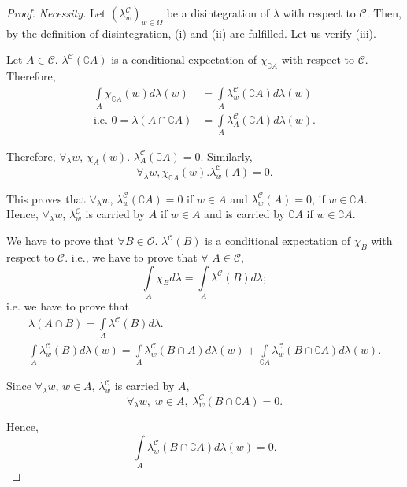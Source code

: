 \begin{proof}{\em Necessity.}
Let $(\lambda^\mathscr{C}_w)_{w \in\Omega}$ be a disintegration of
$\lambda$ with respect to $\mathscr{C}$. Then, by the definition of
disintegration, (i) and (ii) are fulfilled. Let us verify (iii). 

Let $A \in\mathscr{C}$. $\lambda^\mathscr{C} (\complement A)$ is a
conditional expectation of $\chi_{\complement A}$ with respect to
$\mathscr{C}$. Therefore,
\begin{align*}
\int\limits_A \chi_{\complement A}(w) d\lambda(w) & = \int\limits_A
\lambda^\mathscr{C}_w (\complement A) d\lambda(w)\\
\text{i.e. }  0 = \lambda (A \cap \complement A) & =
\int\limits_A \lambda^\mathscr{C}_A (\complement A)
d\lambda(w). 
\end{align*}\pageoriginale

Therefore, $\forall_\lambda w$, $\chi_A(w)$. $\lambda^\mathscr{C}_A
(\complement A) = 0$. Similarly, 
$$
\forall_\lambda w, \chi_{\complement A} (w). \lambda^\mathscr{C}_w (A)
=0. 
$$

This proves that $\forall_\lambda w$, $\lambda^\mathscr{C}_w
(\complement A) = 0$ if $w \in A$ and  $\lambda^\mathscr{C}_w(A) =0$,
if $w \in\complement A$. Hence, $\forall_\lambda w$,
$\lambda^\mathscr{C}_w$ is carried by $A$ if $w \in A$ and is carried
by $\complement A$ if $w \in\complement A$. 


\medskip
{} We have to prove that $\forall B \in
\mathscr{O}$. $\lambda^\mathscr{C}(B)$ is a conditional expectation of
$\chi_B$ with respect to $\mathscr{C}$. i.e., we have to prove that
$\forall$ $A \in \mathscr{C}$,
$$
\int\limits_A \chi_B d \lambda = \int\limits_A \lambda^\mathscr{C} (B)
d\lambda; 
$$ 
i.e. we have to prove that 
\begin{align*}
\lambda(A \cap B) = \int\limits_A \lambda^\mathscr{C} (B) d\lambda.\\
\int\limits_A \lambda^\mathscr{C}_w (B) d \lambda(w) = \int\limits_A
\lambda^\mathscr{C}_w (B \cap A)  d \lambda (w) +
\int\limits_{\complement A} \lambda^\mathscr{C}_w (B \cap \complement
A) d \lambda (w). 
\end{align*}

Since $\forall_\lambda w$, $w \in A$, $\lambda^\mathscr{C}_w$ is
carried by $A$,
$$
\forall_\lambda w, \; w\in A, \; \lambda^\mathscr{C}_w (B \cap
\complement A) = 0. 
$$

Hence, 
$$
\int\limits_A \lambda^\mathscr{C}_w (B\cap \complement A) d \lambda(w)
= 0. 
$$


\end{proof}
